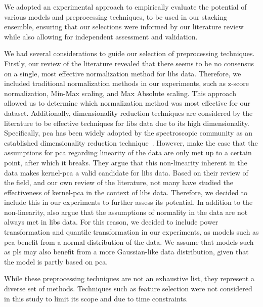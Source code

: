 We adopted an experimental approach to empirically evaluate the potential of various models and preprocessing techniques, to be used in our stacking ensemble, ensuring that our selections were informed by our literature review while also allowing for independent assessment and validation.

We had several considerations to guide our selection of preprocessing techniques.
Firstly, our review of the literature revealed that there seems to be no consensus on a single, most effective normalization method for \gls{libs} data.
Therefore, we included traditional normalization methods in our experiments, such as z-score normalization, Min-Max scaling, and Max Absolute scaling.
This approach allowed us to determine which normalization method was most effective for our dataset. 
Additionally, dimensionality reduction techniques are considered by the literature to be effective techniques for \gls{libs} data due to its high dimensionality. 
Specifically, \gls{pca} has been widely adopted by the spectroscopic community as an established dimensionality reduction technique~\cite{pca_review_paper}. 
However, \citet{pca_review_paper} make the case that the assumptions for \gls{pca} regarding linearity of the data are only met up to a certain point, after which it breaks. 
They argue that this non-linearity inherent in the data makes \gls{kernel-pca} a valid candidate for \gls{libs} data. 
Based on their review of the field, and our own review of the literature, not many have studied the effectiveness of \gls{kernel-pca} in the context of \gls{libs} data. 
Therefore, we decided to include this in our experiments to further assess its potential. 
In addition to the non-linearity, \citet{pca_review_paper} also argue that the assumptions of normality in the data are not always met in \gls{libs} data. 
For this reason, we decided to include power transformation and quantile transformation in our experiments, as models such as \gls{pca} benefit from a normal distribution of the data. 
We assume that models such as \gls{pls} may also benefit from a more Gaussian-like data distribution, given that the model is partly based on \gls{pca}.

While these preprocessing techniques are not an exhaustive list, they represent a diverse set of methods.
Techniques such as feature selection were not considered in this study to limit its scope and due to time constraints.

